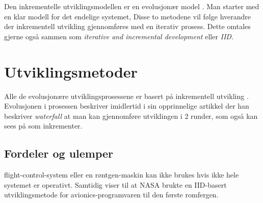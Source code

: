 Den inkrementelle utviklingsmodellen er en evolusjonær model \cite{wiki:incremental_build_model}. Man starter med en klar modell for det endelige systemet, 
Disse to metodene vil følge hverandre der inkrementell utvikling gjennomføres med en iterativ prosess.
Dette omtales gjerne også sammen som \textit{iterative and incremental development} eller \textit{IID}.

\section{Utviklingsmetoder}
Alle de evolusjonære utviklingsprosessene er basert på inkrementell utvikling \cite{larman2003iterative}. Evolusjonen i prosessen 
\textcite{royce1970software} beskriver imidlertid i sin opprinnelige artikkel der han beskriver \textit{waterfall} at man kan 
gjennomføre utviklingen i 2 runder, som også kan sees på som inkrementer.

\subsection{Fordeler og ulemper}
flight-control-system eller en røntgen-maskin kan ikke brukes hvis ikke hele systemet er operativt. Samtidig viser
\textcite{larman2003iterative} til at NASA brukte en IID-basert utviklingsmetode for avionics-programvaren til den første romfergen.

